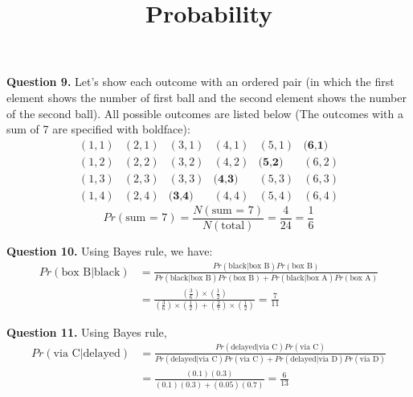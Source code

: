 \documentclass{ximera}
\title{Probability}
\begin{document}
\maketitle

\textbf{Question 9.} Let's show each outcome with an ordered pair (in which the first element shows the number of first ball and the second element shows the number of the second ball). All possible outcomes are listed below (The outcomes with a sum of 7 are specified with boldface):
\begin{equation*}
\begin{matrix}
(1,1) & (2,1) & (3,1) & (4,1) & (5,1) & \textbf{(6,1)} \\
(1,2) & (2,2) & (3,2) & (4,2) & \textbf{(5,2)} & (6,2) \\
(1,3) & (2,3) & (3,3) & \textbf{(4,3)} & (5,3) & (6,3) \\
(1,4) & (2,4) & \textbf{(3,4)} & (4,4) & (5,4) & (6,4)
\end{matrix}
\end{equation*}
\begin{equation*}
Pr (\text{sum = 7}) = \frac{N(\text{sum = 7})}{N(\text{total})} = \frac{4}{24} = \frac{1}{6}
\end{equation*}

\textbf{Question 10.} Using Bayes rule, we have:
\begin{align*}
Pr (\text{box B} | \text{black}) &= \frac{Pr(\text{black} | \text{box B}) Pr(\text{box B})}{Pr(\text{black} | \text{box B}) Pr(\text{box B}) + Pr(\text{black} | \text{box A}) Pr(\text{box A})} \\
&=\frac{(\frac{3}{6}) \times (\frac{1}{2})}{(\frac{3}{6}) \times (\frac{1}{2}) + (\frac{2}{7}) \times (\frac{1}{2})} = \frac{7}{11}
\end{align*}

\textbf{Question 11.} Using Bayes rule,
\begin{align*}
Pr (\text{via C} | \text{delayed}) &= \frac{Pr(\text{delayed} | \text{via C}) Pr(\text{via C})}{Pr(\text{delayed} | \text{via C}) Pr(\text{via C}) + Pr(\text{delayed} | \text{via D}) Pr(\text{via D})} \\
& = \frac{(0.1)(0.3)}{(0.1)(0.3) + (0.05)(0.7)} = \frac{6}{13}
\end{align*}
\end{document}

